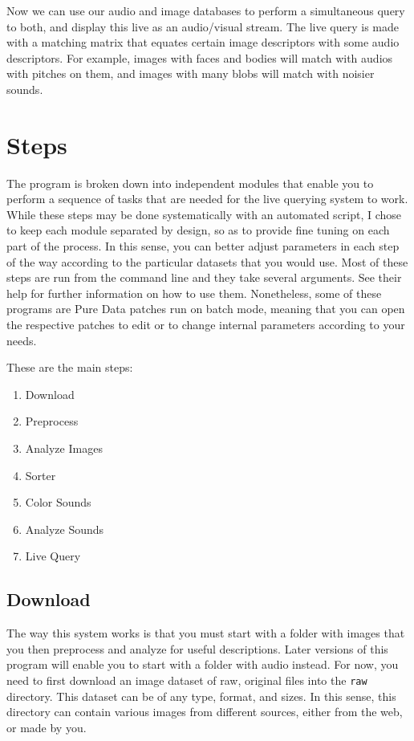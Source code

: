 Now we can use our audio and image databases to perform a simultaneous query to both, and display this live as an audio/visual stream. The live query is made with a matching matrix that equates certain image descriptors with some audio descriptors. For example, images with faces and bodies will match with audios with pitches on them, and images with many blobs will match with noisier sounds.



\section{Steps}

The program is broken down into independent modules that enable you to perform a sequence of tasks that are needed for the live querying system to work. While these steps may be done systematically with an automated script, I chose to keep each module separated by design, so as to provide fine tuning on each part of the process. In this sense, you can better adjust parameters in each step of the way according to the particular datasets that you would use. Most of these steps are run from the command line and they take several arguments. See their help for further information on how to use them. Nonetheless, some of these programs are Pure Data patches run on batch mode, meaning that you can open the respective patches to edit or to change internal parameters according to your needs. 

These are the main steps:

\begin{enumerate}
  \singlespacing
  \item Download
  \item Preprocess
  \item Analyze Images
  \item Sorter
  \item Color Sounds
  \item Analyze Sounds
  \item Live Query
\end{enumerate}

\subsection{Download}

The way this system works is that you must start with a folder with images that you then preprocess and analyze for useful descriptions. Later versions of this program will enable you to start with a folder with audio instead. For now, you need to first download an image dataset of raw, original files into the \texttt{raw} directory. This dataset can be of any type, format, and sizes. In this sense, this directory can contain various images from different sources, either from the web, or made by you.

